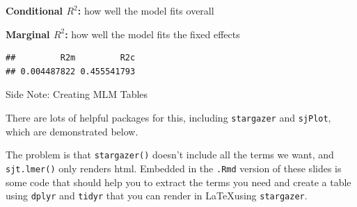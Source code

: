 \begin{frame}[fragile]

\small
\textbf{Conditional $R^2$:} how well the model fits overall

\textbf{Marginal $R^2$:} how well the model fits the fixed effects

\begin{Shaded}
\begin{Highlighting}[]
\OperatorTok{::}
\end{Highlighting}
\end{Shaded}

\begin{verbatim}
##         R2m         R2c 
## 0.004487822 0.455541793
\end{verbatim}

\normalsize

\end{frame}

\begin{frame}[fragile]{Side Note: Creating MLM Tables}

There are lots of helpful packages for this, including
\texttt{stargazer} and \texttt{sjPlot}, which are demonstrated below.\\
\tiny

\begin{Shaded}
\begin{Highlighting}[]
\OperatorTok{::}
\OperatorTok{::}
\end{Highlighting}
\end{Shaded}

\normalsize

The problem is that \texttt{stargazer()} doesn't include all the terms
we want, and \texttt{sjt.lmer()} only renders html. Embedded in the
\texttt{.Rmd} version of these slides is some code that should help you
to extract the terms you need and create a table using \texttt{dplyr}
and \texttt{tidyr} that you can render in \LaTeX using
\texttt{stargazer}.

\end{frame}

